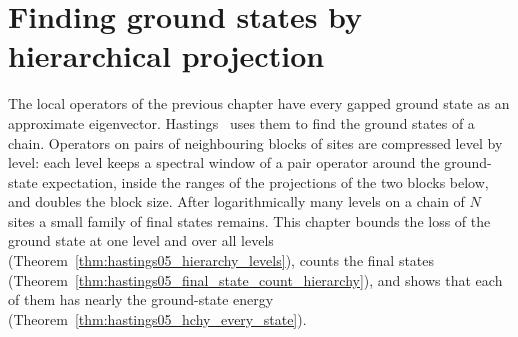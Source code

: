 \chapter{Finding ground states by hierarchical projection}
\label{ch:hastings_hierarchy}

The local operators of the previous chapter have every gapped ground state
as an approximate eigenvector. Hastings~\cite{Hastings2006Solving} uses them
to find the ground states of a chain. Operators on pairs of neighbouring
blocks of sites are compressed level by level: each level keeps a spectral
window of a pair operator around the ground-state expectation, inside the
ranges of the projections of the two blocks below, and doubles the block
size. After logarithmically many levels on a chain of $N$ sites a small family of final
states remains. This chapter bounds the loss of the ground state at one
level and over all levels (Theorem~\ref{thm:hastings05_hierarchy_levels}),
counts the final states
(Theorem~\ref{thm:hastings05_final_state_count_hierarchy}), and shows that
each of them has nearly the ground-state energy
(Theorem~\ref{thm:hastings05_hchy_every_state}).







